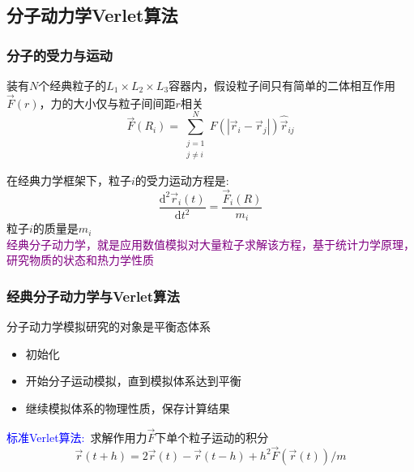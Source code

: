 \subsection{分子动力学{\rm Verlet}算法}
\frame
{
	\frametitle{分子的受力与运动}
	装有$N$个经典粒子的$L_1\times L_2\times L_3$容器内，假设粒子间只有简单的二体相互作用%
	$\vec F(r)$，力的大小仅与粒子间间距$r$相关
	\begin{displaymath}
		\vec F(R_i)=\sum_{\substack{j=1\\j\neq i}}^N F(|\vec r_i-\vec r_j|)\hat{\vec r}_{ij}
	\end{displaymath}
	{\fontsize{7.2pt}{6.2pt}}

	在经典力学框架下，粒子$i$的受力运动方程是:~
	\begin{displaymath}
		\dfrac{\mathrm{d}^2\vec r_i(t)}{\mathrm{d}t^2}=\dfrac{\vec F_i(R)}{m_i}
	\end{displaymath}
	粒子$i$的质量是$m_i$\\
	\textcolor{purple}{经典分子动力学，就是应用数值模拟对大量粒子求解该方程，基于统计力学原理，研究物质的状态和热力学性质}
}

\frame
{
	\frametitle{经典分子动力学与\textrm{Verlet}算法}
	分子动力学模拟研究的对象是平衡态体系
	\begin{itemize}
		\item 初始化
		\item 开始分子运动模拟，直到模拟体系达到平衡
		\item 继续模拟体系的物理性质，保存计算结果
	\end{itemize}
	\textcolor{blue}{标准\textrm{Verlet}算法:~}求解作用力$\vec F$下单个粒子运动的积分
	\begin{displaymath}
		\vec r(t+h)=2\vec r(t)-\vec r(t-h)+h^2\vec F(\vec r(t))/m
	\end{displaymath}
	{\fontsize{7.2pt}{6.2pt}}
}

